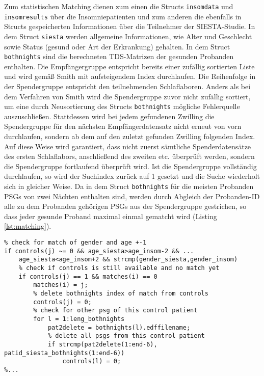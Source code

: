 Zum statistischen Matching dienen zum einen die Structs \texttt{insomdata} und \texttt{insomresults} über die Insomniepatienten und zum anderen die ebenfalls in Structs gespeicherten Informationen über die Teilnehmer der SIESTA-Studie. In dem Struct \texttt{siesta} werden allgemeine Informationen, wie Alter und Geschlecht sowie Status (gesund oder Art der Erkrankung) gehalten. In dem Struct \texttt{bothnights} sind die berechneten \acs{TDS}-Matrizen der gesunden Probanden enthalten. Die Empfängergruppe entspricht bereits einer zufällig sortierten Liste und wird gemäß Smith mit aufsteigendem Index durchlaufen. Die Reihenfolge in der Spendergruppe entspricht den teilnehmenden Schlaflaboren. Anders als bei dem Verfahren von Smith wird die Spendergruppe zuvor nicht zufällig sortiert, um eine durch Neusortierung des Structs \texttt{bothnights} mögliche Fehlerquelle auszuschließen. Stattdessen wird bei jedem gefundenen Zwilling die Spendergruppe für den nächsten Empfängerdatensatz nicht erneut von vorn durchlaufen, sondern ab dem auf den zuletzt gefunden Zwilling folgenden Index. Auf diese Weise wird garantiert, dass nicht zuerst sämtliche Spenderdatensätze des ersten Schlaflabors, anschließend des zweiten etc. überprüft werden, sondern die Spendergruppe fortlaufend überprüft wird. Ist die Spendergruppe vollständig durchlaufen, so wird der Suchindex zurück auf 1 gesetzt und die Suche wiederholt sich in gleicher Weise. Da in dem Struct \texttt{bothnights} für die meisten Probanden \acs{PSG}s von zwei Nächten enthalten sind, werden durch Abgleich der Probanden-ID alle zu dem Probanden gehörigen \acs{PSG}s aus der Spendergruppe gestrichen, so dass jeder gesunde Proband maximal einmal gematcht wird (Listing \ref{lst:matching}).

\newpage

\lstset{language=Matlab}
\begin{lstlisting}[caption={Statistisches Matching in Skript ma\_statistical\_matching.m}, label={lst:matching}]
% ...
% check for match of gender and age +-1
if controls(j) ~= 0 && age_siesta>age_insom-2 && ...
    age_siesta<age_insom+2 && strcmp(gender_siesta,gender_insom)
    % check if controls is still available and no match yet
    if controls(j) == 1 && matches(i) == 0
        matches(i) = j;
        % delete bothnights index of match from controls
        controls(j) = 0;
        % check for other psg of this control patient
        for l = 1:leng_bothnights
            pat2delete = bothnights(l).edffilename;
            % delete all psgs from this control patient
            if strcmp(pat2delete(1:end-6), patid_siesta_bothnights(1:end-6))
                controls(l) = 0;
%...
\end{lstlisting}

